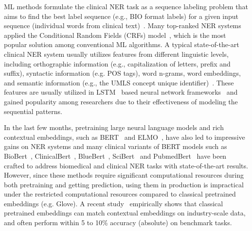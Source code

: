 \documentclass[a4paper,conference]{IEEEtran}
\begin{document}
ML methods formulate the clinical NER task as a sequence labeling problem that aims to find the best label sequence (e.g., BIO format labels) for a given input sequence (individual words from clinical text)~\cite{wu2017clinical}.  Many top-ranked NER systems applied the Conditional Random Fields (CRFs) model~\cite{lafferty2001conditional}, which is the most popular solution among conventional ML algorithms. A typical state-of-the-art clinical NER system usually utilizes features from different linguistic levels, including orthographic information (e.g., capitalization of letters, prefix and suffix), syntactic information (e.g. POS tags), word n-grams, word embeddings, and semantic information (e.g., the UMLS concept unique identifier)~\cite{wu2017clinical}. These features are usually utilized in LSTM~\cite{hochreiter1997long} based neural network frameworks~\cite{huang2015bidirectional, chiu2016named, ma2016end} and gained popularity among researchers due to their effectiveness of modeling the sequential patterns. 

In the last few months, pretraining large neural language models and rich contextual embeddings, such as BERT~\cite{devlin2018bert} and ELMO~\cite{peters2018deep}, have also led to impressive gains on NER systems and many clinical variants of BERT models such as BioBert~\cite{lee1901so}, ClinicalBert~\cite{alsentzer2019publicly}, BlueBert~\cite{peng2019transfer}, SciBert~\cite{beltagy2019scibert} and PubmedBert~\cite{gu2020domain} have been crafted to address biomedical and clinical NER tasks with state-of-the-art results. However, since these methods require significant computational resources during both pretraining and getting prediction, using them in production is impractical under the restricted computational resources compared to classical pretrained embeddings (e.g. Glove). A recent study~\cite{arora2020contextual} empirically shows that classical pretrained embeddings can match contextual embeddings on industry-scale data, and often perform within 5 to 10\% accuracy (absolute) on benchmark tasks.
\end{document}
